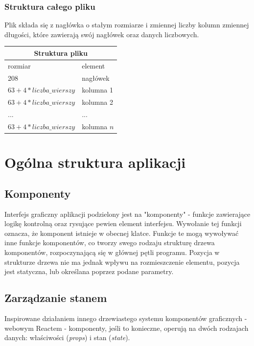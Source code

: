 \documentclass{article}
\begin{document}
	\pagebreak
	\subsubsection{Struktura całego pliku}
	Plik składa się z nagłówka o stałym rozmiarze i zmiennej liczby kolumn zmiennej długości, które zawierają swój nagłówek oraz danych liczbowych.
	
	\begin{center}
		\begin{tabular}{|p{5cm}|p{5cm}|} \hline
			\multicolumn{2}{|c|}{Struktura pliku} \\\hline
			rozmiar  & element \\\hline
			\hline
			208 & nagłówek  \\\hline
			$63+4*liczba\_wierszy$  & kolumna 1 \\\hline
			$63+4*liczba\_wierszy$  & kolumna 2 \\\hline
			...  & ... \\\hline
			$63+4*liczba\_wierszy$  & kolumna $n$ \\\hline
		\end{tabular}
	\end{center}
	
	
	\pagebreak
	
	

	\section{Ogólna struktura aplikacji}
	\subsection{Komponenty}
	Interfejs graficzny aplikacji podzielony jest na "komponenty" - funkcje zawierające logikę kontrolną oraz rysujące pewien element interfejsu. Wywołanie tej funkcji oznacza, że komponent istnieje w obecnej klatce.
	Funkcje te mogą wywoływać inne funkcje komponentów, co tworzy swego rodzaju strukturę drzewa komponentów, rozpoczynającą się w głównej pętli programu. Pozycja w strukturze drzewa nie ma jednak wpływu na rozmieszczenie elementu, pozycja jest statyczna, lub określana poprzez podane parametry.
	
	\subsection{Zarządzanie stanem}
	Inspirowane działaniem innego drzewiastego systemu komponentów graficznych - webowym Reactem - komponenty, jeśli to konieczne, operują na dwóch rodzajach danych: właściwości (\textit{props}) i stan (\textit{state}).
\end{document}
